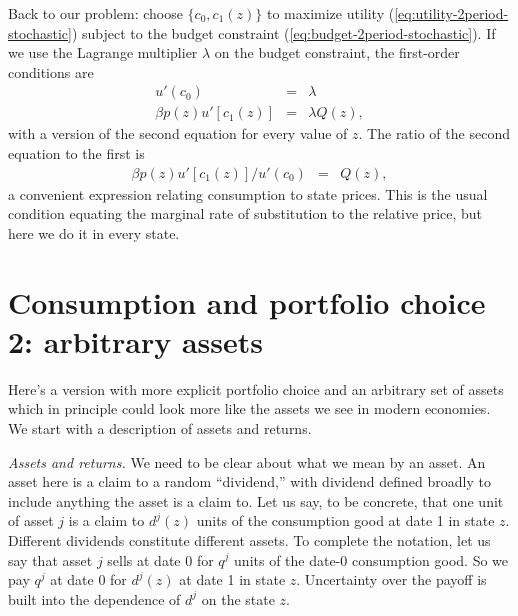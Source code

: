 \documentclass[11pt]{article}
\begin{document}
Back to our problem:  choose $\{c_0, c_1(z)\}$ to maximize
utility (\ref{eq:utility-2period-stochastic}) subject to the budget constraint
(\ref{eq:budget-2period-stochastic}).
If we use the Lagrange multiplier $\lambda$ on the budget constraint,
the first-order conditions are
\begin{eqnarray*}
    u'(c_0)  &=& \lambda  \\
       \beta p(z) u'[c_1(z)]  &=& \lambda Q(z),
\end{eqnarray*}
with a version of the second equation for every value of $z$.
The ratio of the second equation to the first is
\begin{eqnarray}
    \beta p(z) u'[c_1(z)]/u'(c_0) &=& Q(z) ,
    \label{eq:con-stateprices}
\end{eqnarray}
a convenient expression relating consumption to state prices.
This is the usual condition equating the marginal rate of substitution
to the relative price, but here we do it in every state.

\begin{comment}
The definition $ r(z) = 1/Q(z)$ gives us
\begin{eqnarray*}
       \{ \beta p(z) u'[c_1(z)] / u'(c_0) \} r(z)  &=& 1 ,
\end{eqnarray*}
a variant of our favorite equation.
It's not all that useful here,
because $r(z)$ for these assets is zero in all states but one,
but if we sum over $z$ we get
\begin{eqnarray*}
     \sum_z  \frac { \beta p(z) u'[c_1(z)] }{ u'(c_0)}\ r(z)  &=&
     E \left( \frac {\beta u'(c_1)}{u'(c_0)} \ r \right)
     \;\;=\;\; 1 ,
     \label{eq:euler-stochastic}
\end{eqnarray*}
a stochastic version of (\ref{eq:euler-deterministic}).
It's a somewhat strange object in this context,
since $r(z)$ is zero in all states by one,
but it illustrates the underlying unity of what we're doing.
\end{comment}


\section{Consumption and portfolio choice 2:  arbitrary assets}

Here's a version with more explicit portfolio choice
and an arbitrary set of assets which in principle could
look more like the assets we see in modern economies.
We start with a description of assets and returns.

{\it Assets and returns.\/}
We need to be clear about what we mean by an asset.
An asset here is a claim to a random ``dividend,''
with dividend defined broadly to include anything the asset is a claim to.
Let us say, to be concrete, that one unit of asset $j$ is a claim to $d^j(z)$ units
of the consumption good at date 1 in state $z$.
Different dividends constitute different assets.
To complete the notation,
let us say that asset $j$ sells at date 0
for $q^j$ units of the date-0 consumption good.
So we pay $q^j$ at date 0 for $d^j(z)$ at date 1 in state $z$.
Uncertainty over the payoff is built into the dependence
of $d^j$ on the state $z$.
\end{document}
